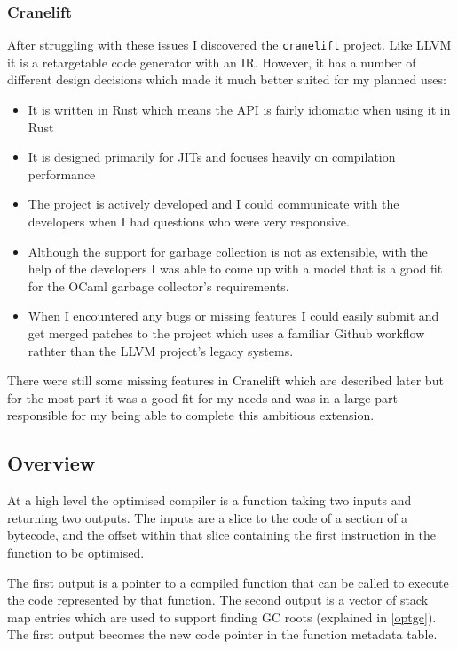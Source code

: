 \subsubsection{Cranelift}

After struggling with these issues I discovered the \texttt{cranelift} project. Like LLVM it is a
retargetable code generator with an IR. However, it has a number of different design decisions
which made it much better suited for my planned uses:

\begin{itemize}
      \item It is written in Rust which means the API is fairly idiomatic when using it in Rust
      \item It is designed primarily for JITs and focuses heavily on compilation performance
      \item The project is actively developed and I could communicate with the developers when I
            had
            questions who were very responsive.
      \item Although the support for garbage collection is not as extensible, with the help of the
            developers I was able to come up with a model that is a good fit for the OCaml garbage
            collector's
            requirements.
      \item When I encountered any bugs or missing features I could easily submit and get merged
            patches to the project which uses a familiar Github workflow rathter than the LLVM
            project's legacy
            systems.
\end{itemize}

There were still some missing features in Cranelift which are described later but for the most
part it was a good fit for my needs and was in a large part responsible for my being able to
complete this ambitious extension.

\subsection{Overview}

At a high level the optimised compiler is a function taking two inputs and returning two outputs.
The inputs are a slice to the code of a section of a bytecode, and the offset within that slice
containing the
first instruction in the function to be optimised.

The first output is a pointer to a compiled function that can be called to execute the code
represented by that function. The second output is a vector of stack map entries which are used
to support finding GC roots (explained in \ref{optgc}). The first output becomes the new code
pointer
in the function metadata table.

